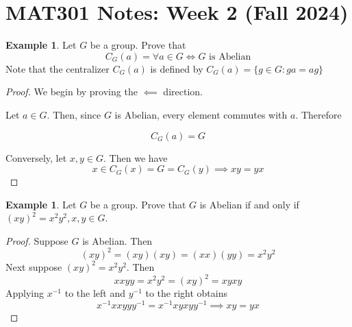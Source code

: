 \documentclass{article}
\theoremstyle{plain} %
\numberwithin{thm}{section} %
\theoremstyle{definition}
\newtheorem{example}[thm]{Example}
\begin{document}
    \section{MAT301 Notes: Week 2 (Fall 2024)}
    \begin{example}
        Let \(G\) be a group. Prove that
        \[
            C_G (a) = \forall a \in G \iff G \text{ is Abelian}
        \]
        Note that the centralizer \(C_G(a)\) is defined by \(C_G(a) = \{ g \in G : ga=ag  \} \)
        \begin{proof}
            We begin by proving the \(\impliedby\) direction.

            Let \(a \in G\). Then, since \(G\) is Abelian, every element commutes with \(a\). Therefore

            \[
                C_G(a) = G
            \]  

            Conversely, let \(x,y \in G\). Then we have
            \[
                x \in C_G(x)=G=C_G(y) \implies xy=yx
            \]

        \end{proof}
    \end{example}
    \begin{example}
        Let \(G\) be a group. Prove that \(G\) is Abelian if and only if \((xy)^2=x^2y^2 , x,y \in G\).
        \begin{proof}
            Suppose \(G\) is Abelian. Then
            \[
                (xy)^2=(xy)(xy)=(xx)(yy)=x^2 y^2
            \] 
            Next suppose \((xy)^2 = x^2 y^2\). Then
            \[
                xxyy = x^2 y^2 = (xy)^2 = xyxy
            \]
            Applying \(x^{-1}\) to the left and \(y^{-1}\) to the right obtains
            \[
                x^{-1} xxyy y^{-1} = x^{-1} xyxy y^{-1} \implies xy=yx
            \]
        \end{proof} 
    \end{example}
\end{document}
